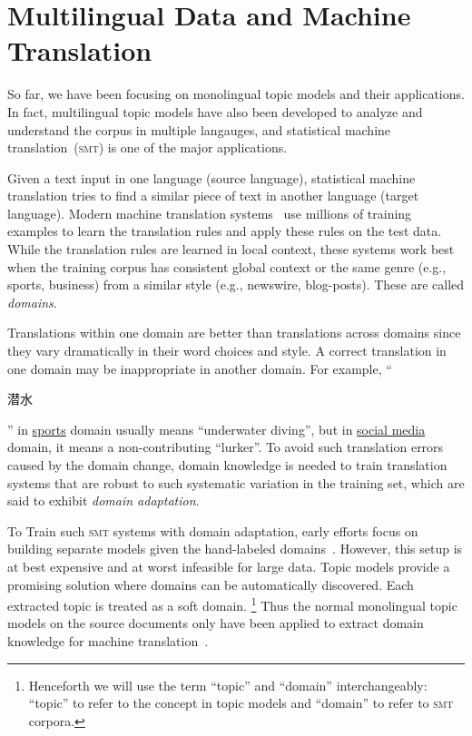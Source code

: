 \chapter{Multilingual Data and Machine Translation}
\label{ch:mt}


So far, we have been focusing on monolingual topic models and their applications. In fact, multilingual topic models have also been developed to analyze and understand the corpus in multiple langauges, and statistical machine translation~(\textsc{smt}) is one of the major applications.

Given a text input in one language (source language), statistical machine translation tries to find a similar piece of text in another language (target language). Modern machine translation systems~\citep{koehn-09} use millions of training examples to learn the translation rules and apply these rules on the test data. While the translation rules are learned in local context, these systems work best when the training corpus has consistent global context or the same genre (e.g., sports, business) from a similar style (e.g., newswire, blog-posts).  These are called \emph{domains}.  

Translations within one domain are better than translations across domains since they vary dramatically in their word choices and style.  A correct translation in one domain may be inappropriate in another domain.  For example, ``\begin{CJK*}{UTF8}{gbsn}潜水\end{CJK*}'' in \underline{sports} domain usually means ``underwater diving'', but in \underline{social media} domain, it means a non-contributing ``lurker''. To avoid such translation errors caused by the domain change, domain knowledge is needed to train translation systems that are robust to such systematic variation in the training set, which are said to exhibit \emph{domain adaptation}.

To Train such \textsc{smt} systems with domain adaptation, early efforts focus on building separate models given the hand-labeled domains~\citep{foster-07,matsoukas-09,chiang-11}. However, this setup is at best expensive and at worst infeasible for large data.  
Topic models provide a promising solution where domains can be automatically discovered. Each extracted topic is treated as a soft domain. \footnote{Henceforth we will use the term ``topic'' and ``domain'' interchangeably: ``topic'' to refer to the concept in topic models and ``domain'' to refer to \textsc{smt} corpora.} Thus the normal monolingual topic models on the source documents only have been applied to extract domain knowledge for machine translation~\citep{Eidelman-12}. 


